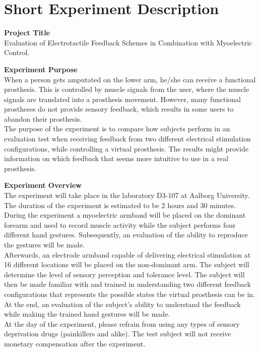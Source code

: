 \section{Short Experiment Description} \label{SED}

\textbf{Project Title} \\
Evaluation of Electrotactile Feedback Schemes in
Combination with Myoelectric Control.

\textbf{Experiment Purpose} \\
When a person gets amputated on the lower arm, he/she can receive a functional prosthesis. This is controlled by muscle signals from the user, where the muscle signals are translated into a prosthesis movement. However, many functional prostheses do not provide sensory feedback, which results in some users to abandon their prosthesis.\\
The purpose of the experiment is to compare how subjects perform in an evaluation test when receiving feedback from two different electrical stimulation configurations, while controlling a virtual prosthesis. The results might provide information on which feedback that seems more intuitive to use in a real prosthesis.   

\textbf{Experiment Overview} \\
The experiment will take place in the laboratory D3-107 at Aalborg University. The duration of the experiment is estimated to be 2 hours and 30 minutes. \\
During the experiment a myoelectric armband will be placed on the dominant forearm and used to record muscle activity while the subject performs four different hand gestures. Subsequently, an evaluation of the ability to reproduce the gestures will be made. \\
Afterwards, an electrode armband capable of delivering electrical stimulation at 16 different locations will be placed on the non-dominant arm. The subject will determine the level of sensory perception and tolerance level. The subject will then be made familiar with and trained in understanding two different feedback configurations that represents the possible states the virtual prosthesis can be in. At the end, an evaluation of the subject’s ability to understand the feedback while making the trained hand gestures will be made. \\
At the day of the experiment, please refrain from using any types of sensory deprivation drugs (painkillers and alike). The test subject will not receive monetary compensation after the experiment. 
